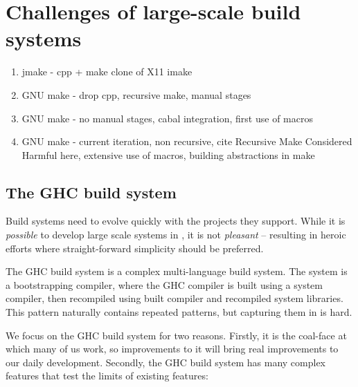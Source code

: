 \section{Challenges of large-scale build systems\label{sec:challenges}}


\begin{enumerate}
  \item jmake - cpp + make clone of X11 imake
  \item GNU make - drop cpp, recursive make, manual stages
  \item GNU make - no manual stages, cabal integration, first
   use of macros
   \item GNU make - current iteration, non recursive, cite Recursive
     Make Considered Harmful here, extensive use of macros,
     building abstractions in make
\end{enumerate}

\subsection{The GHC build system}

Build systems need to evolve quickly with the projects they support. While it is
\textit{possible} to develop large scale systems in \make, it is not
\textit{pleasant} -- resulting in heroic efforts where straight-forward
simplicity should be preferred.

The GHC build system is a complex multi-language build system. The system is a
bootstrapping compiler, where the GHC compiler is built using a system compiler,
then recompiled using built compiler and recompiled system libraries. This
pattern naturally contains repeated patterns, but capturing them in \make{} is
hard.

We focus on the GHC build system for two reasons. Firstly, it is the coal-face
at which many of us work, so improvements to it will bring real improvements to
our daily development. Secondly, the GHC build system has many complex features
that test the limits of existing features:

